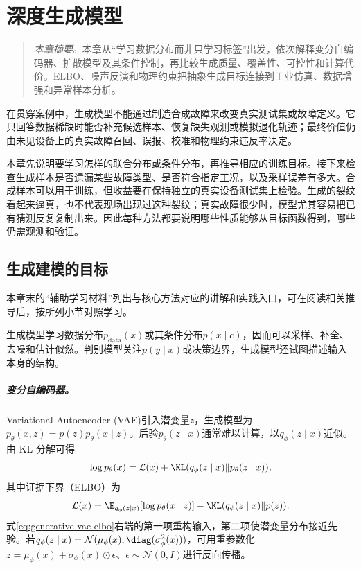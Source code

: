 ﻿\chapter{深度生成模型}
\begin{quote}\small
\textit{本章摘要。}本章从“学习数据分布而非只学习标签”出发，依次解释变分自编码器、扩散模型及其条件控制，再比较生成质量、覆盖性、可控性和计算代价。ELBO、噪声反演和物理约束把抽象生成目标连接到工业仿真、数据增强和异常样本分析。
\end{quote}

在贯穿案例中，生成模型不能通过制造合成故障来改变真实测试集或故障定义。它只回答数据稀缺时能否补充候选样本、恢复缺失观测或模拟退化轨迹；最终价值仍由未见设备上的真实故障召回、误报、校准和物理约束违反率决定。

本章先说明要学习怎样的联合分布或条件分布，再推导相应的训练目标。接下来检查生成样本是否遗漏某些故障类型、是否符合指定工况，以及采样误差有多大。合成样本可以用于训练，但收益要在保持独立的真实设备测试集上检验。生成的裂纹看起来逼真，也不代表现场出现过这种裂纹；真实故障很少时，模型尤其容易把已有猜测反复复制出来。因此每种方法都要说明哪些性质能够从目标函数得到，哪些仍需观测和验证。

\section{生成建模的目标}

本章末的“辅助学习材料”列出与核心方法对应的讲解和实践入口，可在阅读相关推导后，按所列小节对照学习。

生成模型学习数据分布$p_{\mathrm{data}}(x)$或其条件分布$p(x\mid c)$，因而可以采样、补全、去噪和估计似然。判别模型关注$p(y\mid x)$或决策边界，生成模型还试图描述输入本身的结构。

\paragraph{变分自编码器。}
Variational Autoencoder (VAE)引入潜变量$z$，生成模型为$p_\theta(x,z)=p(z)p_\theta(x\mid z)$\cite{kingma2014vae}。后验$p_\theta(z\mid x)$通常难以计算，以$q_\phi(z\mid x)$近似。由 KL 分解可得
\begin{equation}
 \log p_\theta(x)=\mathcal{L}(x)+\KL(q_\phi(z\mid x)\|p_\theta(z\mid x)),
\end{equation}
其中证据下界（ELBO）为
\begin{equation}
 \mathcal{L}(x)=\E_{q_\phi(z\mid x)}[\log p_\theta(x\mid z)]-\KL(q_\phi(z\mid x)\|p(z)).\label{eq:generative-vae-elbo}
\end{equation}
式\eqref{eq:generative-vae-elbo}右端的第一项重构输入，第二项使潜变量分布接近先验。若$q_\phi(z\mid x)=\mathcal{N}(\mu_\phi(x),\diag(\sigma_\phi^2(x)))$，可用重参数化$z=\mu_\phi(x)+\sigma_\phi(x)\odot\epsilon$、$\epsilon\sim\mathcal{N}(0,I)$进行反向传播。


